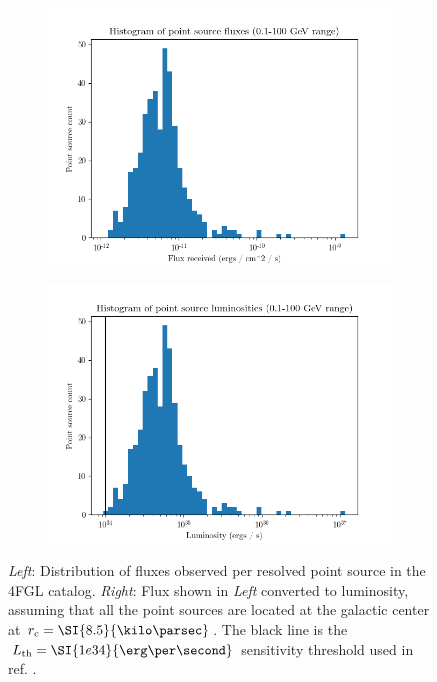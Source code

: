 \documentclass{C://Aliases//Dropbox-MIT//Latex_Templates//personal}
\begin{document}
\begin{figure}
    \centering
    \begin{subfigure}{.5\textwidth}
        \centering
        \includegraphics[width=.99\linewidth]{figs/flux-histo.png}
    \end{subfigure}%
    \begin{subfigure}{.5\textwidth}
        \centering
        \includegraphics[width=.99\linewidth]{figs/luminosity-histo.png}
    \end{subfigure}
    \caption{\textit{Left}: Distribution of fluxes observed per resolved point source in the 4FGL catalog. \textit{Right}: Flux shown in \textit{Left} converted to luminosity, assuming that all the point sources are located at the galactic center at $r_\text{c} = \SI{8.5}{\kilo\parsec}$. The black line is the $L_\text{th}=\SI{1e34}{\erg\per\second}$ sensitivity threshold used in ref. \cite{Zhong:2019ycb}.}
    \label{fig:observed-distros}
\end{figure}
\end{document}
